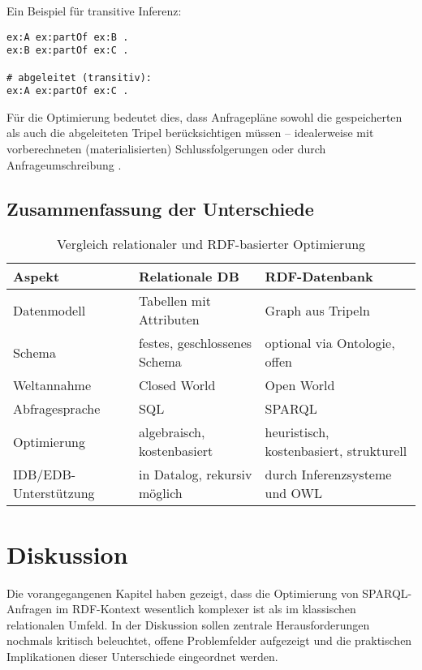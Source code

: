 \documentclass[12pt]{article}
\begin{document}
Ein Beispiel für transitive Inferenz:

\begin{lstlisting}[caption=Beispiel für abgeleitete Tripel durch Inferenz]
ex:A ex:partOf ex:B .
ex:B ex:partOf ex:C .

# abgeleitet (transitiv):
ex:A ex:partOf ex:C .
\end{lstlisting}

Für die Optimierung bedeutet dies, dass Anfragepläne sowohl die gespeicherten als auch die abgeleiteten Tripel berücksichtigen müssen – idealerweise mit vorberechneten (materialisierten) Schlussfolgerungen oder durch Anfrageumschreibung \cite{motik2007sparql}.

\subsection{Zusammenfassung der Unterschiede}

\vspace{0.5em}
\begin{table}[h]
\centering
\caption{Vergleich relationaler und RDF-basierter Optimierung}
\begin{tabular}{|p{4.5cm}|p{5cm}|p{5cm}|}
\hline
\textbf{Aspekt} & \textbf{Relationale DB} & \textbf{RDF-Datenbank} \\
\hline
Datenmodell & Tabellen mit Attributen & Graph aus Tripeln \\
Schema & festes, geschlossenes Schema & optional via Ontologie, offen \\
Weltannahme & Closed World & Open World \\
Abfragesprache & SQL & SPARQL \\
Optimierung & algebraisch, kostenbasiert & heuristisch, kostenbasiert, strukturell \\
IDB/EDB-Unterstützung & in Datalog, rekursiv möglich & durch Inferenzsysteme und OWL \\
\hline
\end{tabular}
\end{table}


\section{Diskussion} \label{sec:diskussion}

Die vorangegangenen Kapitel haben gezeigt, dass die Optimierung von SPARQL-Anfragen im RDF-Kontext wesentlich komplexer ist als im klassischen relationalen Umfeld. In der Diskussion sollen zentrale Herausforderungen nochmals kritisch beleuchtet, offene Problemfelder aufgezeigt und die praktischen Implikationen dieser Unterschiede eingeordnet werden.
\end{document}
